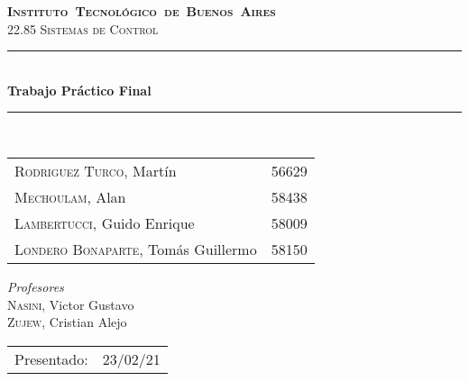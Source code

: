 \begin{titlepage}
\newcommand{\HRule}{\rule{\linewidth}{0.5mm}}
\center
\mbox{\textsc{\LARGE \bfseries {Instituto Tecnológico de Buenos Aires}}}\\[1.5cm]
\textsc{\Large 22.85 Sistemas de Control}\\[0.5cm]


\HRule \\[0.6cm]
{ \Huge \bfseries Trabajo Práctico Final}\\[0.4cm] 
\HRule \\[1.5cm]


{\large

\vspace{3px}

\begin{tabular}{lr}
\textsc{Rodriguez Turco}, Martín  & 56629\\
\textsc{Mechoulam}, Alan & 58438\\ 	
\textsc{Lambertucci}, Guido Enrique  & 58009 \\
\textsc{Londero Bonaparte}, Tomás Guillermo  & 58150 \\
\end{tabular}

\vspace{20px}

\emph{Profesores}\\
\textsc{Nasini}, Victor Gustavo \\
\textsc{Zujew}, Cristian Alejo \\
\vspace{3px}

\vspace{100px}

\begin{tabular}{ll}

Presentado: & 23/02/21\\

\end{tabular}

}

\vfill

\end{titlepage}
